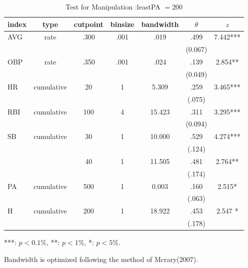 \documentclass[dvipdfmx, 12pt]{article}
\begin{document}
\begin{table}[H]
  \small
  \centering
  \begin{tabular}{lcccccc}\hline
    index & type & cutpoint & binsize & bandwidth & $\theta$ & $z$
    \\ \hline \hline
    AVG & rate & .300 & .001 & .019 &  .499 & 7.442*** \\
    & & & & & (0.067) & \\
    OBP & rate & .350 & .001 & .024 &  .139 & 2.854** \\
    & & & & & (0.049) &  \\
    HR & cumulative & 20 & 1 & 5.309 & .259 & 3.465*** \\
    & & & & & (.075)  & \\
    RBI & cumulative & 100 & 4 & 15.423 & .311 & 3.295*** \\
    & & & & & (0.094) & \\
    SB & cumulative & 30 & 1 & 10.000 & .529 & 4.274*** \\
    & & & & & (.124) & \\
    & & 40 & 1 & 11.505 & .481 & 2.764** \\
    & & & & & (.174) & \\
    PA & cumulative & 500 & 1 & 0.003 & .160 & 2.515* \\
    & & & & &(.063) & \\
    H & cumulative & 200 & 1 & 18.922 & .453 & 2.547 * \\
    & & & & & (.178) & \\ \hline \hline
  \end{tabular}
  \footnotesize
  \flushright
      ***: $p<0.1\%$, **: $p<1\%$, *: $p<5\%$.

    Bandwidth is optimized following the method of Mcrary(2007).
  \caption{Test for Manipulation :leastPA $= 200$}
\end{table}

\newpage
\end{document}
